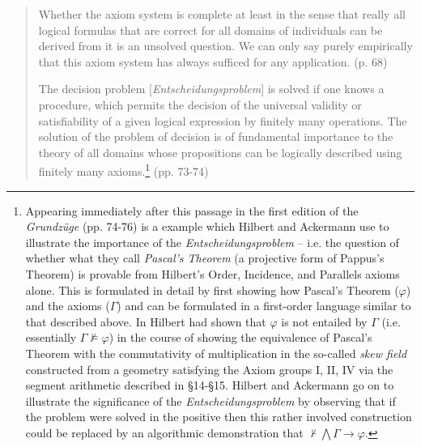 \documentclass[11pt,fleqn,leqno]{article}
\def\phi{\varphi}
\def\proves{\vdash}
\begin{document}
\begin{quote}
\footnotesize{Whether the axiom system is complete at least in the sense that really all logical formulas that are correct for all domains of individuals can be derived from it is an unsolved question. We can only say purely empirically that this axiom system has always sufficed for any application.  \hfill (p. 68)

The  decision problem [\textsl{Entscheidungsproblem}] is solved if one knows a procedure, which permits the decision of the universal validity or satisfiability of a given logical expression by finitely many operations. The solution of the problem of decision is of fundamental importance to the theory of all domains whose propositions can be logically described using finitely many axioms.\footnote{Appearing immediately after this passage in the first edition of the \textsl{Grundz\"uge} (pp. 74-76) is a example which Hilbert and Ackermann use to illustrate the importance of the \textsl{Entscheidungsproblem}  -- i.e. the question of whether what they call \textsl{Pascal's Theorem} (a projective form of Pappus's Theorem) is provable from Hilbert's Order, Incidence, and Parallels axioms  alone.   This is formulated in detail by first showing how Pascal's Theorem ($\phi$) and the axioms ($\Gamma$) and can be formulated in a first-order language similar to that described above.  In \citeyearpar{Hilbert1899} Hilbert had shown that $\phi$ is not  entailed by $\Gamma$ (i.e. essentially $\Gamma \not\models \phi$) in the course of showing the equivalence of Pascal's Theorem with the commutativity of multiplication in the so-called \textsl{skew field} constructed from a geometry satisfying the Axiom groups I, II, IV via the segment arithmetic described in \S14-\S15.    Hilbert and Ackermann go on to illustrate the significance of the \textsl{Entscheidungsproblem} by observing that if the problem were solved in the positive then this rather involved construction could be replaced by an algorithmic demonstration that $\not\proves \bigwedge \Gamma \rightarrow \phi$.\label{epng}} \hfill (pp. 73-74)}
\end{quote}
\end{document}
